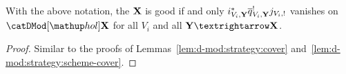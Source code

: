 \begin{Lem}\label{lem:d-mod:strategy:cover-by-relative-compactifications}
    With the above notation, the $\mathbf X$ is good if and only $i_{V_i,\mathbf Y}^* \overline q_{V_i,\mathbf Y}^! j_{V_i,!}$ vanishes on $\catDModHol{\stack X}$ for all $V_i$ and all $\stack Y → \stack X$.
\end{Lem}

\begin{proof}
    Similar to the proofs of Lemmas~\ref{lem:d-mod:strategy:cover} and~\ref{lem:d-mod:strategy:scheme-cover}.
\end{proof}
